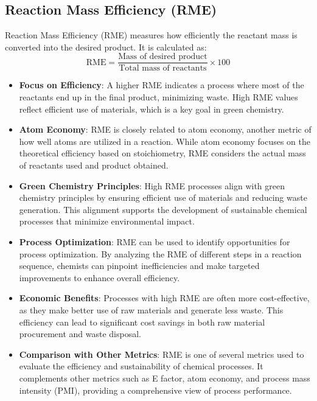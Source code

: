 \documentclass[11pt]{article}
\begin{document}
\subsection{Reaction Mass Efficiency (RME)}
Reaction Mass Efficiency (RME) measures how efficiently the reactant mass is converted into the desired product. It is calculated as:
\[
\text{RME} = \frac{\text{Mass of desired product}}{\text{Total mass of reactants}} \times 100
\]
\begin{itemize}
    \item \textbf{Focus on Efficiency}: A higher RME indicates a process where most of the reactants end up in the final product, minimizing waste. High RME values reflect efficient use of materials, which is a key goal in green chemistry.
    \item \textbf{Atom Economy}: RME is closely related to atom economy, another metric of how well atoms are utilized in a reaction. While atom economy focuses on the theoretical efficiency based on stoichiometry, RME considers the actual mass of reactants used and product obtained.
    \item \textbf{Green Chemistry Principles}: High RME processes align with green chemistry principles by ensuring efficient use of materials and reducing waste generation. This alignment supports the development of sustainable chemical processes that minimize environmental impact.
    \item \textbf{Process Optimization}: RME can be used to identify opportunities for process optimization. By analyzing the RME of different steps in a reaction sequence, chemists can pinpoint inefficiencies and make targeted improvements to enhance overall efficiency.
    \item \textbf{Economic Benefits}: Processes with high RME are often more cost-effective, as they make better use of raw materials and generate less waste. This efficiency can lead to significant cost savings in both raw material procurement and waste disposal.
    \item \textbf{Comparison with Other Metrics}: RME is one of several metrics used to evaluate the efficiency and sustainability of chemical processes. It complements other metrics such as E factor, atom economy, and process mass intensity (PMI), providing a comprehensive view of process performance.
\end{itemize}
\end{document}
